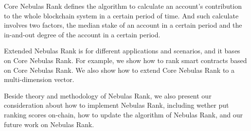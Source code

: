 Core Nebulas Rank defines the algorithm to calculate an account's contribution
to the whole blockchain system in a certain period of time. And such
calculate involves two factors, the median stake of an account in a certain
period and the in-and-out degree of the account in a certain period.

Extended Nebulas Rank is for different applications and scenarios,
and it bases on Core Nebulas Rank. For example, we show how to rank smart
contracts based on Core Nebulas Rank. We also show how to extend Core
Nebulas Rank to a multi-dimension vector.

Beside theory and methodology of Nebulas Rank, we also present our
consideration about how to implement Nebulas Rank, including wether
put ranking scores on-chain, how to update the algorithm of Nebulas Rank,
and our future work on Nebulas Rank.

